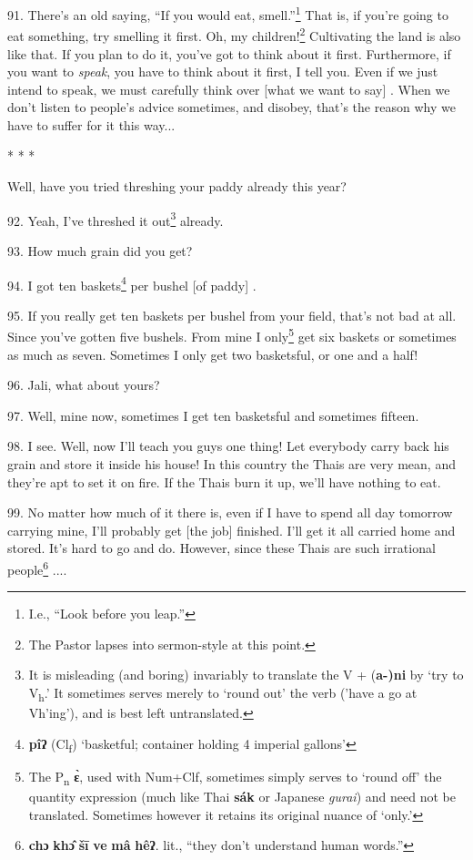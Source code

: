 91. There's an old saying, ``If you would eat, smell.''\footnote{I.e., ``Look before you leap.''} That
is, if you're going to eat something, try smelling it first. Oh, my children!\footnote{The Pastor lapses into sermon-style at this point.}
Cultivating the land is also like that. If you plan to do it, you've got to think
about it first. Furthermore, if you want to \textit{speak}, you have to think about
it first, I tell you. Even if we just intend to speak, we must carefully think
over [what we want to say] . When we don't listen to people's advice sometimes,
and disobey, that's the reason why we have to suffer for it this way...

\begin{center}
* * *
\end{center}

Well, have you tried threshing your paddy already this year?

92. Yeah, I've threshed it out\footnote{It is misleading (and boring) invariably to translate the V + (\textbf{a-)ni} by `try to V\textsubscript{h}.' It sometimes serves merely to `round out' the verb ('have a go at Vh'ing'), and is best left untranslated.} already.

93. How much grain did you get?

94. I got ten baskets\footnote{\textbf{pîʔ} (Cl\textsubscript{f}) `basketful; container holding 4 imperial gallons'} per bushel [of paddy] .

95. If you really get ten baskets per bushel from your field, that's not bad at
all. Since you've gotten five bushels. From mine I only\footnote{The P\textsubscript{n } \textbf{ɛ̀}, used with Num+Clf, sometimes simply serves to `round off' the quantity expression (much like Thai \textbf{sák} or Japanese \textit{gurai}) and need not be translated. Sometimes however it retains its original nuance of `only.'} get six baskets or
sometimes as much as seven. Sometimes I only get two basketsful, or one and a half!

96. Jali, what about yours?

97. Well, mine now, sometimes I get ten basketsful and sometimes fifteen.

98. I see. Well, now I'll teach you guys one thing! Let everybody carry back his
grain and store it inside his house! In this country the Thais are very mean, and
they're apt to set it on fire. If the Thais burn it up, we'll have nothing to eat.

99. No matter how much of it there is, even if I have to spend all day tomorrow
carrying mine, I'll probably get [the job] finished. I'll get it all carried home
and stored. It's hard to go and do. However, since these Thais are such irrational
people\footnote{\textbf{chɔ} \textbf{khɔ̂} \textbf{šī} \textbf{ve} \textbf{mâ} \textbf{hêʔ}. lit., ``they don't understand human words.''} ....

